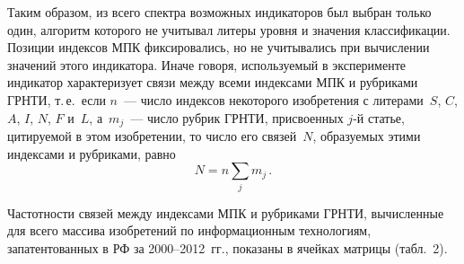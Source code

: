 \begin{multicols}{2}
     Таким образом, из всего спектра возможных индикаторов был выбран только один,
     алгоритм которого не учитывал литеры уровня и значения классификации. Позиции индексов МПК фиксировались, но не учитывались
при вычислении значений этого индикатора. Иначе говоря, используемый в эксперименте индикатор характеризует
связи между всеми индексами МПК и рубриками ГРНТИ, т.\,е.\ если $n$~--- число индексов некоторого изобретения с
литерами~$S$, $C$, $A$, $I$, $N$, $F$ и~$L$, а~$m_j$~--- число рубрик ГРНТИ,
присвоенных $j$-й \mbox{статье}, цитируемой
в этом изобретении, то число его связей~$N$, образуемых этими индексами и рубриками,\linebreak
равно
     $$
     N=n\sum\limits_j m_j\,.
     $$

     Частотности связей между индексами МПК и рубриками ГРНТИ, вычисленные для
     всего массива изобретений по
информационным технологиям, запатентованных в РФ за 2000--2012~гг.,
показаны в ячейках мат\-ри\-цы (табл.~2).
\begin{table*}\small
\begin{center}
      \vspace*{2ex}


\end{center}
\end{table*}
\end{multicols}
